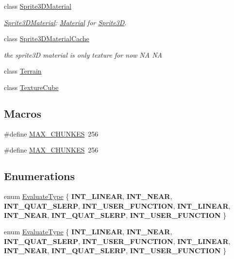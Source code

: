 \begin{DoxyCompactItemize}
class \hyperlink{classSprite3DMaterial}{Sprite3\+D\+Material}
\begin{DoxyCompactList}\small\item\em \hyperlink{classSprite3DMaterial}{Sprite3\+D\+Material}\+: \hyperlink{classMaterial}{Material} for \hyperlink{classSprite3D}{Sprite3D}. \end{DoxyCompactList}\item 
class \hyperlink{classSprite3DMaterialCache}{Sprite3\+D\+Material\+Cache}
\begin{DoxyCompactList}\small\item\em the sprite3D material is only texture for now  NA  NA \end{DoxyCompactList}\item 
class \hyperlink{classTerrain}{Terrain}
\item 
class \hyperlink{classTextureCube}{Texture\+Cube}
\end{DoxyCompactItemize}
\subsection*{Macros}
\begin{DoxyCompactItemize}
\item 
\#define \hyperlink{group____3d_gab12c6db0eef20a3be56a8bf8452ae432}{M\+A\+X\+\_\+\+C\+H\+U\+N\+K\+ES}~256
\item 
\#define \hyperlink{group____3d_gab12c6db0eef20a3be56a8bf8452ae432}{M\+A\+X\+\_\+\+C\+H\+U\+N\+K\+ES}~256
\end{DoxyCompactItemize}
\subsection*{Enumerations}
\begin{DoxyCompactItemize}
\item 
enum \hyperlink{group____3d_ga3c41e728b3058f4688800b2d4d1f5c95}{Evaluate\+Type} \{ \newline
{\bfseries I\+N\+T\+\_\+\+L\+I\+N\+E\+AR}, 
{\bfseries I\+N\+T\+\_\+\+N\+E\+AR}, 
{\bfseries I\+N\+T\+\_\+\+Q\+U\+A\+T\+\_\+\+S\+L\+E\+RP}, 
{\bfseries I\+N\+T\+\_\+\+U\+S\+E\+R\+\_\+\+F\+U\+N\+C\+T\+I\+ON}, 
\newline
{\bfseries I\+N\+T\+\_\+\+L\+I\+N\+E\+AR}, 
{\bfseries I\+N\+T\+\_\+\+N\+E\+AR}, 
{\bfseries I\+N\+T\+\_\+\+Q\+U\+A\+T\+\_\+\+S\+L\+E\+RP}, 
{\bfseries I\+N\+T\+\_\+\+U\+S\+E\+R\+\_\+\+F\+U\+N\+C\+T\+I\+ON}
 \}
\item 
enum \hyperlink{group____3d_ga3c41e728b3058f4688800b2d4d1f5c95}{Evaluate\+Type} \{ \newline
{\bfseries I\+N\+T\+\_\+\+L\+I\+N\+E\+AR}, 
{\bfseries I\+N\+T\+\_\+\+N\+E\+AR}, 
{\bfseries I\+N\+T\+\_\+\+Q\+U\+A\+T\+\_\+\+S\+L\+E\+RP}, 
{\bfseries I\+N\+T\+\_\+\+U\+S\+E\+R\+\_\+\+F\+U\+N\+C\+T\+I\+ON}, 
\newline
{\bfseries I\+N\+T\+\_\+\+L\+I\+N\+E\+AR}, 
{\bfseries I\+N\+T\+\_\+\+N\+E\+AR}, 
{\bfseries I\+N\+T\+\_\+\+Q\+U\+A\+T\+\_\+\+S\+L\+E\+RP}, 
{\bfseries I\+N\+T\+\_\+\+U\+S\+E\+R\+\_\+\+F\+U\+N\+C\+T\+I\+ON}
 \}
\end{DoxyCompactItemize}


